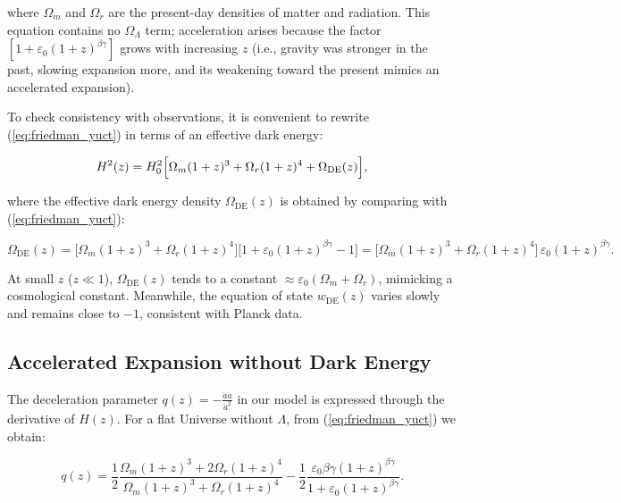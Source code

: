 \documentclass[12pt]{article}
\theoremstyle{remark}
\begin{document}
	where \(\Omega_m\) and \(\Omega_r\) are the present-day densities of matter and radiation. This equation contains no \(\Omega_\Lambda\) term; acceleration arises because the factor \([1 + \varepsilon_0 (1+z)^{\beta\gamma}]\) grows with increasing \(z\) (i.e., gravity was stronger in the past, slowing expansion more, and its weakening toward the present mimics an accelerated expansion).
	
	To check consistency with observations, it is convenient to rewrite (\ref{eq:friedman_yuct}) in terms of an effective dark energy:
	
	\begin{equation}
		H^2(z) = H_0^2\Bigl[\Omega_m (1+z)^3 + \Omega_r (1+z)^4 + \Omega_{\mathrm{DE}}(z)\Bigr],
		\label{eq:effective_de}
	\end{equation}
	
	where the effective dark energy density \(\Omega_{\mathrm{DE}}(z)\) is obtained by comparing with (\ref{eq:friedman_yuct}):
	
	\begin{equation}
		\Omega_{\mathrm{DE}}(z) = \bigl[\Omega_m (1+z)^3 + \Omega_r (1+z)^4\bigr]\bigl[1 + \varepsilon_0 (1+z)^{\beta\gamma} - 1\bigr] = \bigl[\Omega_m (1+z)^3 + \Omega_r (1+z)^4\bigr]\,\varepsilon_0 (1+z)^{\beta\gamma}.
		\label{eq:de_yuct}
	\end{equation}
	
	At small \(z\) (\(z \ll 1\)), \(\Omega_{\mathrm{DE}}(z)\) tends to a constant \(\approx \varepsilon_0 (\Omega_m + \Omega_r)\), mimicking a cosmological constant. Meanwhile, the equation of state \(w_{\mathrm{DE}}(z)\) varies slowly and remains close to \(-1\), consistent with Planck data.
	
	\subsection{Accelerated Expansion without Dark Energy}
	
	The deceleration parameter \(q(z) = -\frac{\ddot{a}a}{\dot{a}^2}\) in our model is expressed through the derivative of \(H(z)\). For a flat Universe without \(\Lambda\), from (\ref{eq:friedman_yuct}) we obtain:
	
	\begin{equation}
		q(z) = \frac{1}{2}\frac{\Omega_m (1+z)^3 + 2\Omega_r (1+z)^4}{\Omega_m (1+z)^3 + \Omega_r (1+z)^4} - \frac{1}{2}\frac{\varepsilon_0 \beta\gamma (1+z)^{\beta\gamma}}{1 + \varepsilon_0 (1+z)^{\beta\gamma}}.
		\label{eq:deceleration}
	\end{equation}
	
\end{document}
